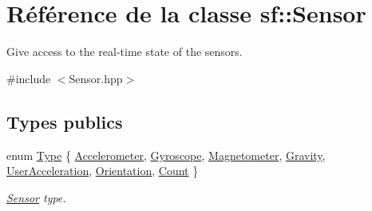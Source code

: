 \hypertarget{classsf_1_1Sensor}{}\section{Référence de la classe sf\+:\+:Sensor}
\label{classsf_1_1Sensor}


Give access to the real-\/time state of the sensors.  




{\ttfamily \#include $<$Sensor.\+hpp$>$}

\subsection*{Types publics}
\begin{DoxyCompactItemize}
\item 
enum \hyperlink{classsf_1_1Sensor_a687375af3ab77b818fca73735bcaea84}{Type} \{ \newline
\hyperlink{classsf_1_1Sensor_a687375af3ab77b818fca73735bcaea84a11bc58199593e217de23641755ecc867}{Accelerometer}, 
\hyperlink{classsf_1_1Sensor_a687375af3ab77b818fca73735bcaea84a1c43984aacd29b1fda5356883fb19656}{Gyroscope}, 
\hyperlink{classsf_1_1Sensor_a687375af3ab77b818fca73735bcaea84ae706bb678bde8d3c370e246ffde6a63d}{Magnetometer}, 
\hyperlink{classsf_1_1Sensor_a687375af3ab77b818fca73735bcaea84afab4d098cc64e791a0c4a9ef6b32db92}{Gravity}, 
\newline
\hyperlink{classsf_1_1Sensor_a687375af3ab77b818fca73735bcaea84ad3a399e0025892b7c53e8767cebb9215}{User\+Acceleration}, 
\hyperlink{classsf_1_1Sensor_a687375af3ab77b818fca73735bcaea84aa428c5260446555de87c69b65f6edf00}{Orientation}, 
\hyperlink{classsf_1_1Sensor_a687375af3ab77b818fca73735bcaea84afcb4a80eb9e3f927c5837207a1b9eb29}{Count}
 \}\begin{DoxyCompactList}\small\item\em \hyperlink{classsf_1_1Sensor}{Sensor} type. \end{DoxyCompactList}
\end{DoxyCompactItemize}
